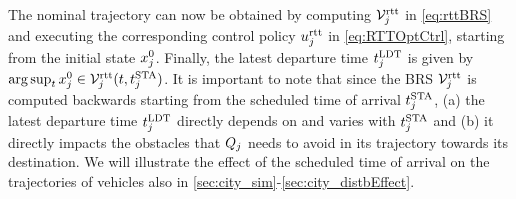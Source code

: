 The nominal trajectory can now be obtained by computing $\mathcal{V}_j^\text{rtt}$ in \eqref{eq:rttBRS} and executing the corresponding control policy $u_j^\text{rtt}$ in \eqref{eq:RTTOptCtrl}, starting from the initial state $x^0_j$. Finally, the latest departure time $t^\text{LDT}_j$ is given by $\arg \sup_t x^0_j \in \mathcal{V}_j^\text{rtt}(t, t^\text{STA}_j)$. It is important to note that since the BRS $\mathcal{V}_j^\text{rtt}$ is computed backwards starting from the scheduled time of arrival $t^\text{STA}_j$, (a) the latest departure time $t^\text{LDT}_j$ directly depends on and varies with $t^\text{STA}_j$ and (b) it directly impacts the obstacles that $Q_j$ needs to avoid in its trajectory towards its destination. We will illustrate the effect of the scheduled time of arrival on the trajectories of vehicles also in \ref{sec:city_sim}-\ref{sec:city_distbEffect}.

